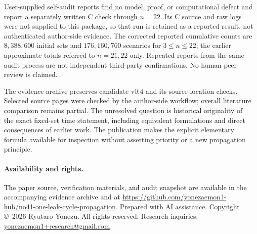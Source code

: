 \documentclass[11pt,a4paper]{article}
\begin{document}
User-supplied self-audit reports find no model, proof, or computational
defect and report a separately written C check through $n=22$. Its C source
and raw logs were not supplied to this package, so that run is retained as
a reported result, not authenticated author-side evidence. The corrected
reported cumulative counts are $8{,}388{,}600$ initial sets and
$176{,}160{,}760$ scenarios for $3\leq n\leq22$; the earlier approximate
totals referred to $n=21,22$ only. Repeated reports from the same audit
process are not independent third-party confirmations. No human peer
review is claimed.

The evidence archive preserves candidate v0.4 and its source-location
checks. Selected source pages were checked by the author-side workflow;
overall literature comparison remains partial. The unresolved question is
historical originality of the exact fixed-set time statement, including
equivalent formulations and direct consequences of earlier work. The
publication makes the explicit elementary formula available for inspection
without asserting priority or a new propagation principle.

\paragraph{Availability and rights.}
The paper source, verification materials, and audit snapshot are available
in the accompanying evidence archive and at
\url{https://github.com/yonezaemon1-hub/no41-one-leak-cycle-propagation}.
Prepared with AI assistance. Copyright \copyright\ 2026 Ryutaro Yonezu.
All rights reserved. Research inquiries:
\href{mailto:yonezaemon1+research@gmail.com}{yonezaemon1+research@gmail.com}.
\end{document}
